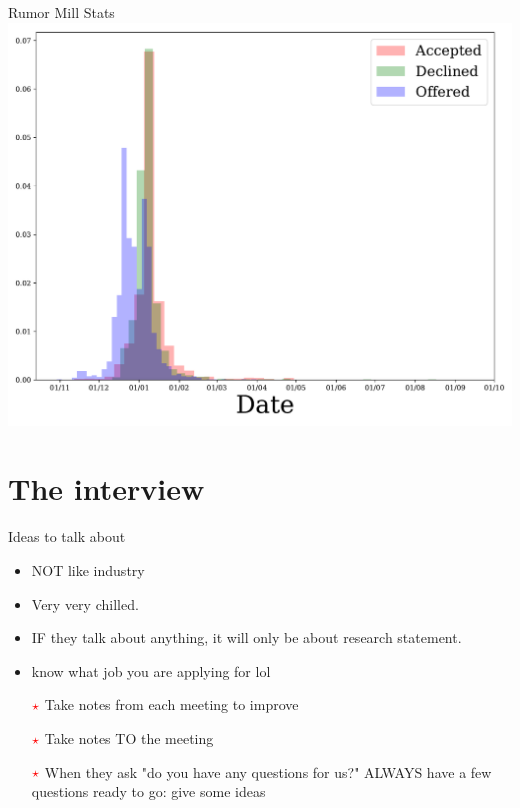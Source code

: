 \documentclass[10pt]{beamer}
\begin{document}
\begin{frame}{Rumor Mill Stats}
\includegraphics[width=\textwidth]{../Distribution.pdf}
\end{frame}

\section{The interview}
\begin{frame}
Ideas to talk about
\begin{itemize}
	\item NOT like industry
	\item Very very chilled.
	\item IF they talk about anything, it will only be about research statement. 
	\item know what job you are applying for lol
	\item [{$\color{red}\star$}] Take notes from each meeting to improve
	\item [{$\color{red}\star$}] Take notes TO the meeting
	\item [{$\color{red}\star$}] When they ask "do you have any questions for us?" ALWAYS have a few questions ready to go: give some ideas
\end{itemize}

\end{frame}
\end{document}
